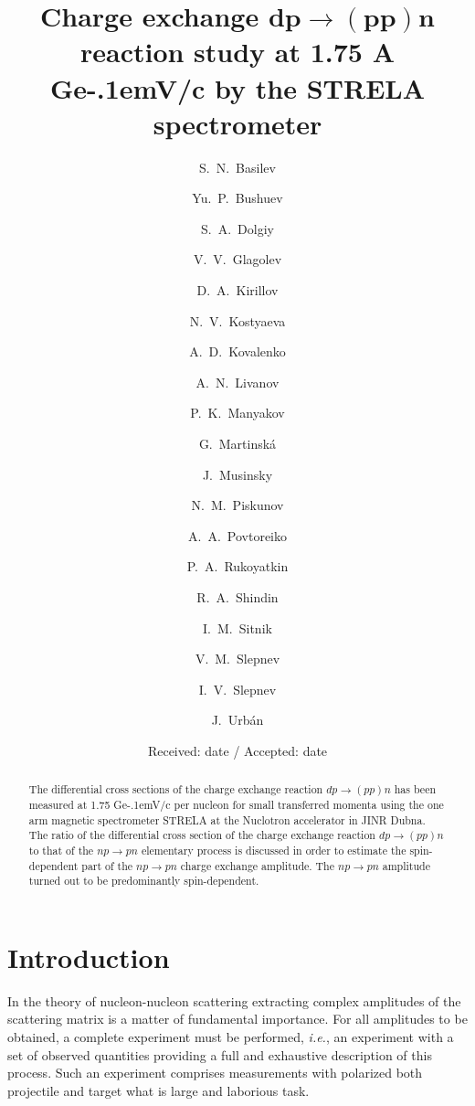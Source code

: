 \documentclass[twocolumn,epjc3]{svjour3}
\newcommand{\np}     {\ensuremath{np \rightarrow pn}\xspace}
\newcommand{\dpchex} {\ensuremath{dp \rightarrow (pp)n}\xspace}
\newcommand{\GeVc}   {Ge\kern-.1emV/c\xspace}
\begin{document}
\title{Charge exchange
  $\boldsymbol{{\dpchex}}$ %
  reaction study at 1.75 A \GeVc by the STRELA spectrometer}

\author{\raggedright
  S.~N.~Basilev    \and Yu.~P.~Bushuev   \and
  S.~A.~Dolgiy     \and V.~V.~Glagolev   \and
  D.~A.~Kirillov   \and N.~V.~Kostyaeva  \and
  A.~D.~Kovalenko  \and A.~N.~Livanov    \and
  P.~K.~Manyakov   \and G.~Martinsk\'{a} \and
  J.~Musinsky  \and N.~M.~Piskunov   \and
  A.~A.~Povtoreiko \and P.~A.~Rukoyatkin \and
  R.~A.~Shindin    \and I.~M.~Sitnik     \and
  V.~M.~Slepnev    \and I.~V.~Slepnev    \and
  J.~Urb\'{a}n
}


\date{Received: date / Accepted: date}
\maketitle

\begin{abstract}
  The differential cross sections of the charge exchange reaction \dpchex has
  been measured at 1.75 \GeVc per nucleon for small transferred momenta using
  the one arm magnetic spectrometer STRELA at the Nuclotron accelerator in JINR
  Dubna. The ratio of the differential cross section of the charge exchange
  reaction \dpchex to that of the \np elementary process is discussed in order
  to estimate the spin-dependent part of the \np charge exchange amplitude. The
  \np amplitude turned out to be predominantly spin-dependent.
\end{abstract}

\section{Introduction}
In the theory of nucleon-nucleon scattering extracting complex amplitudes of the
scattering matrix is a matter of fundamental importance. For all amplitudes to
be obtained, a complete experiment must be performed, \textit{i.e.}, an
experiment with a set of observed quantities providing a full and exhaustive
description of this process. Such an experiment comprises measurements with
polarized both projectile and target what is large and laborious task.
\end{document}
